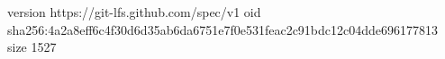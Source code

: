 version https://git-lfs.github.com/spec/v1
oid sha256:4a2a8eff6c4f30d6d35ab6da6751e7f0e531feac2c91bdc12c04dde696177813
size 1527
